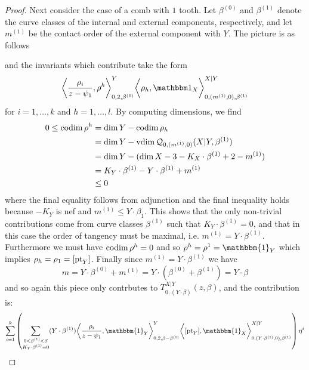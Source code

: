 \begin{proof}
Next consider the case of a comb with $1$ tooth. Let $\beta^{(0)}$ and $\beta^{(1)}$ denote the curve classes of the internal and external components, respectively, and let $m^{(1)}$ be the contact order of the external component with $Y$. The picture is as follows
\begin{center}

\end{center}
and the invariants which contribute take the form
\begin{equation*} \bigg\langle \dfrac{\rho_i}{z-\psi_1},\rho^h\bigg\rangle_{0,2,\beta^{(0)}}^Y \bigg\langle \rho_h, \mathbbm 1_{X}\bigg\rangle_{0,(m^{(1)},0),\beta^{(1)}}^{X|Y} \end{equation*}
for $i = 1, \ldots, k$ and $h = 1, \ldots, l$. By computing dimensions, we find
\begin{align*}
0\leq \operatorname{codim} \rho^h &= \dim Y-\operatorname{codim} \rho_h \\
&= \dim Y-\operatorname{vdim} \mathcal{Q}_{0,(m^{(1)},0)}(X|Y,\beta^{(1)}) \\
&= \dim Y-(\dim X-3-K_{X}\cdot \beta^{(1)}+2-m^{(1)})\\
&= K_Y \cdot \beta^{(1)} - Y \cdot \beta^{(1)}+m^{(1)} \\
&\leq 0
\end{align*}
where the final equality follows from adjunction and the final inequality holds because $-K_Y$ is nef and $m^{(1)}\leq Y \cdot \beta_1$. This shows that the only non-trivial contributions come from curve classes $\beta^{(1)}$ such that $K_Y \cdot \beta^{(1)}=0$, and that in this case the order of tangency must be maximal, i.e. $m^{(1)}=Y \cdot \beta^{(1)}$. Furthermore we must have $\operatorname{codim} \rho^h = 0$ and so $\rho^h = \rho^1 = \mathbbm{1}_Y$ which implies $\rho_h = \rho_1 = [\operatorname{pt}_Y]$. Finally since $m^{(1)}=Y \cdot \beta^{(1)}$ we have
\begin{equation*} m = Y \cdot \beta^{(0)}+m^{(1)}=Y \cdot (\beta^{(0)} + \beta^{(1)}) = Y \cdot \beta \end{equation*}
and so again this piece only contrbutes to $T_{0,(Y\cdot\beta)}^{X|Y}(z,\beta)$, and the contribution is:
\begin{equation*} \sum_{i=1}^k \left( \sum_{\substack{0 < \beta^{(1)} < \beta \\ K_Y \cdot \beta^{(1)}=0}} (Y \cdot \beta^{(1)}) \bigg\langle \dfrac{\rho_i}{z-\psi_1}, \mathbbm{1}_Y \bigg\rangle_{0,2,\beta-\beta^{(1)}}^Y \bigg\langle [\pt_Y], \mathbbm{1}_X \bigg\rangle_{0,(Y \cdot \beta^{(1)},0),\beta^{(1)}}^{X|Y} \right) \eta^i \end{equation*}

\end{proof}
